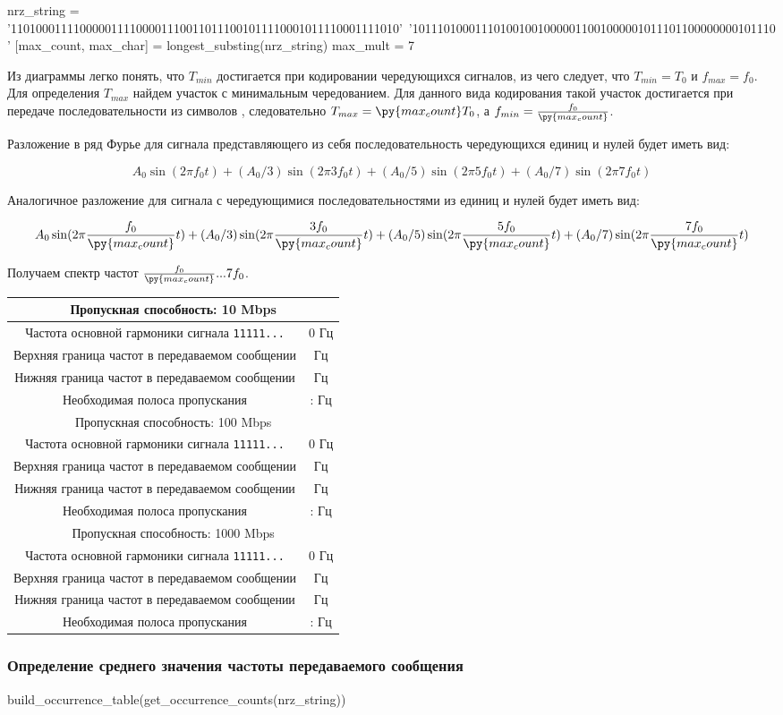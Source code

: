 \documentclass[12pt, a4paper]{article}
\newcommand{\bandwidthEntry}[1]{
  \hline
  \multicolumn{2}{|c|}{Пропускная способность: #1 Mbps} \\
  \hline
  Частота основной гармоники сигнала \texttt{11111...} & 0 Гц \\
  Верхняя граница частот в передаваемом сообщении & \py{int(max_mult * f_0[#1])} Гц \\
  Нижняя граница частот в передаваемом сообщении & \py{int(f_0[#1] / max_count)} Гц \\
  Необходимая полоса пропускания & \py{int(f_0[#1] / max_count)} : \py{int(max_mult * f_0[#1])} Гц \\
}
\begin{document}
\begin{pycode}
nrz_string = '11010001111000001111000011100110111001011110001011110001111010'\
  '1011101000111010010010000011001000001011101100000000101110'
[max_count, max_char] = longest_substing(nrz_string)
max_mult = 7
\end{pycode}

Из диаграммы легко понять, что $T_{min}$ достигается при кодировании чередующихся
сигналов, из чего следует, что $T_{min} = T_0$ и $f_{max} = f_0$. Для определения
$T_{max}$ найдем участок с минимальным чередованием. Для данного вида кодирования
такой участок достигается при передаче последовательности из \py{max_count}
символов \texttt{\py{max_char}},
следовательно $T_{max} = \py{max_count} T_0$, а $f_{min} = \frac{f_0}{\py{max_count}}$.

Разложение в ряд Фурье для сигнала представляющего из себя последовательность
чередующихся единиц и нулей будет иметь вид:

$$A_0 \sin(2 \pi f_0 t) + (A_0 / 3) \sin(2 \pi 3 f_0 t) +
  (A_0 / 5) \sin(2 \pi 5 f_0 t) + (A_0 / 7) \sin(2 \pi 7 f_0 t)$$

Аналогичное разложение для сигнала с чередующимися последовательностями из
\py{max_count} единиц и нулей будет иметь вид:

$$A_0 \sin(2 \pi \frac{f_0}{\py{max_count}} t) + (A_0 / 3) \sin(2 \pi \frac{3 f_0}{\py{max_count}} t) +
  (A_0 / 5) \sin(2 \pi \frac{5 f_0}{\py{max_count}} t) + (A_0 / 7) \sin(2 \pi \frac{7 f_0}{\py{max_count}} t)$$

Получаем спектр частот $\frac{f_0}{\py{max_count}}...7 f_0$.

\newpage

\begin{tabular}{| c | c |}
  \bandwidthEntry{10}
  \bandwidthEntry{100}
  \bandwidthEntry{1000}
  \hline
\end{tabular}

\subsubsection*{Определение среднего значения чаcтоты передаваемого сообщения}

\begin{pycode}
build_occurrence_table(get_occurrence_counts(nrz_string))
\end{pycode}
\end{document}
